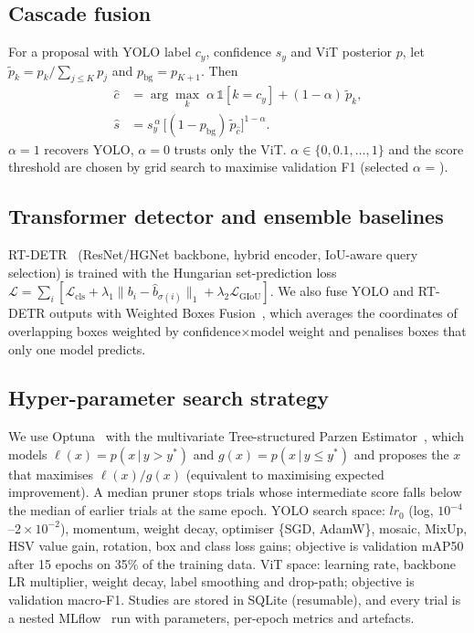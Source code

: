 \IfFileExists{IEEEtran.cls}{\documentclass[conference]{IEEEtran}}%
\begin{document}
\subsection{Cascade fusion}
For a proposal with YOLO label $c_y$, confidence $s_y$ and ViT posterior $p$, let $\tilde p_k = p_k/\sum_{j\le K}p_j$ and $p_{\text{bg}}=p_{K+1}$. Then
\begin{align}
\hat c &= \arg\max_k\;\alpha\,\mathbb{1}[k=c_y] + (1-\alpha)\,\tilde p_k,\\
\hat s &= s_y^{\,\alpha}\,\big[(1-p_{\text{bg}})\,\tilde p_{\hat c}\big]^{1-\alpha}.
\end{align}
$\alpha{=}1$ recovers YOLO, $\alpha{=}0$ trusts only the ViT. $\alpha\in\{0,0.1,\dots,1\}$ and the score threshold are chosen by grid search to maximise validation F1 (selected $\alpha$ = \Alpha{}).

\subsection{Transformer detector and ensemble baselines}
RT-DETR~\cite{rtdetr} (ResNet/HGNet backbone, hybrid encoder, IoU-aware query selection) is trained with the Hungarian set-prediction loss $\mathcal{L}=\sum_i[\mathcal{L}_{\text{cls}}+\lambda_1\|b_i-\hat b_{\sigma(i)}\|_1+\lambda_2\mathcal{L}_{\text{GIoU}}]$. We also fuse YOLO and RT-DETR outputs with Weighted Boxes Fusion~\cite{wbf}, which averages the coordinates of overlapping boxes weighted by confidence$\times$model weight and penalises boxes that only one model predicts.

\subsection{Hyper-parameter search strategy}
We use Optuna~\cite{optuna} with the multivariate Tree-structured Parzen Estimator~\cite{tpe}, which models $\ell(x)=p(x\,|\,y{>}y^*)$ and $g(x)=p(x\,|\,y{\le}y^*)$ and proposes the $x$ that maximises $\ell(x)/g(x)$ (equivalent to maximising expected improvement). A median pruner stops trials whose intermediate score falls below the median of earlier trials at the same epoch. YOLO search space: $lr_0$ (log, $10^{-4}$--$2{\times}10^{-2}$), momentum, weight decay, optimiser \{SGD, AdamW\}, mosaic, MixUp, HSV value gain, rotation, box and class loss gains; objective is validation mAP50 after 15 epochs on 35\% of the training data. ViT space: learning rate, backbone LR multiplier, weight decay, label smoothing and drop-path; objective is validation macro-F1. Studies are stored in SQLite (resumable), and every trial is a nested MLflow~\cite{mlflow} run with parameters, per-epoch metrics and artefacts.
\end{document}
